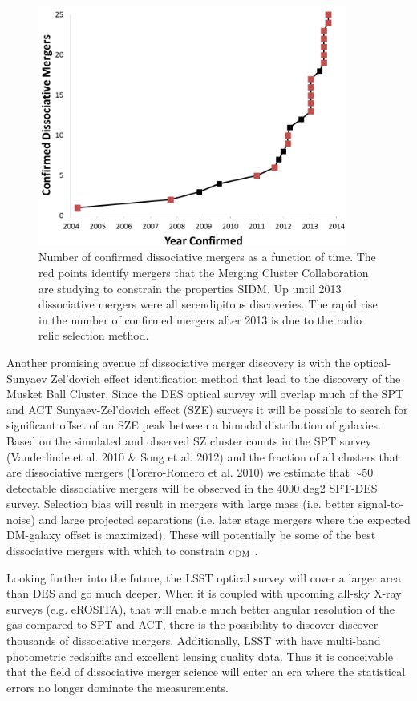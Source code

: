 {\begin{figure}
\centering
\includegraphics[width=4in]{Chapter5/NumberOfConfirmedDissociativeMergers.png}
\caption[Number of confirmed dissociative mergers as a function of time.]{
Number of confirmed dissociative mergers as a function of time.
The red points identify mergers that the Merging Cluster Collaboration are studying to  constrain the properties SIDM.
Up until 2013 dissociative mergers were all serendipitous discoveries.
The rapid rise in the number of confirmed mergers after 2013 is due to the radio relic selection method.
}
\label{figure:N_Mergers}
\end{figure}

Another promising avenue of dissociative merger discovery is with the optical-Sunyaev Zel'dovich effect identification method that lead to the discovery of the Musket Ball Cluster.
Since the DES optical survey \citep{Collaboration:2005vv} will overlap much of the SPT \citep{Ruhl:2004io} and ACT \citep{Hincks:2010ff} Sunyaev-Zel'dovich effect (SZE) surveys it will be possible to search for significant offset of an SZE peak between a bimodal distribution of galaxies.
Based on the simulated and observed SZ cluster counts in the SPT survey (Vanderlinde et al. 2010 \& Song et al. 2012) and the fraction of all clusters that are dissociative mergers (Forero-Romero et al. 2010) we estimate that $\sim$50 detectable dissociative mergers will be observed in the 4000 deg2 SPT-DES survey.  Selection bias will result in mergers with large mass (i.e. better signal-to-noise) and large projected separations (i.e. later stage mergers where the expected DM-galaxy offset is maximized).  These will potentially be some of the best dissociative mergers with which to constrain $\sigma_{\rm DM}$ .

Looking further into the future, the LSST optical survey \citep{Tyson:2002hn} will cover a larger area than DES and go much deeper.
When it is coupled with upcoming all-sky X-ray surveys (e.g. eROSITA), that will enable much better angular resolution of the gas compared to SPT and ACT, there is the possibility to discover discover thousands of dissociative mergers.
Additionally, LSST with have multi-band photometric redshifts and excellent lensing quality data.
Thus it is conceivable that the field of dissociative merger science will enter an era where the statistical errors no longer dominate the measurements. 

}
